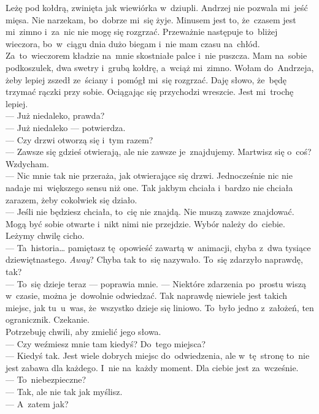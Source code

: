 \documentclass[9pt, a5paper]{memoir}
\begin{document}
Leżę pod kołdrą, zwinięta jak wiewiórka w~dziupli. Andrzej nie pozwala mi~jeść mięsa. Nie narzekam, bo~dobrze mi~się żyje. Minusem jest to, że~czasem jest mi~zimno i~za~nic nie mogę się rozgrzać. Przeważnie następuje to~bliżej wieczora, bo~w~ciągu dnia dużo biegam i~nie mam czasu na~chłód. Za~to~wieczorem kładzie na~mnie skostniałe palce i~nie puszcza. Mam na~sobie podkoszulek, dwa swetry i~grubą kołdrę, a~wciąż mi~zimno. Wołam do~Andrzeja, żeby lepiej zszedł ze~ściany i~pomógł mi~się rozgrzać. Daję słowo, że~będę trzymać rączki przy sobie. Ociągając się przychodzi wreszcie. Jest mi~trochę lepiej.\\
--- Już niedaleko, prawda?\\
--- Już niedaleko --- potwierdza.\\
--- Czy drzwi otworzą się i~tym razem?\\
--- Zawsze się gdzieś otwierają, ale nie zawsze je~znajdujemy. Martwisz się o~coś?\\
Wzdycham.\\
--- Nic mnie tak nie przeraża, jak otwierające się drzwi. Jednocześnie nic nie nadaje mi~większego sensu niż one. Tak jakbym chciała i~bardzo nie chciała zarazem, żeby cokolwiek się działo.\\
--- Jeśli nie będziesz chciała, to~cię nie znajdą. Nie muszą zawsze znajdować. Mogą być sobie otwarte i~nikt nimi nie przejdzie. Wybór należy do~ciebie.\\
Leżymy chwilę cicho.\\
--- Ta~historia\dots{} pamiętasz tę~opowieść zawartą w~animacji, chyba z~dwa tysiące dziewiętnastego. \textit{Away}? Chyba tak to~się nazywało. To~się zdarzyło naprawdę, tak?\\
--- To~się dzieje teraz --- poprawia mnie. --- Niektóre zdarzenia po~prostu wiszą w~czasie, można je~dowolnie odwiedzać. Tak naprawdę niewiele jest takich miejsc, jak tu~u~was, że~wszystko dzieje się liniowo. To~było jedno z~założeń, ten ogranicznik. Czekanie.\\
Potrzebuję chwili, aby zmielić jego słowa.\\
--- Czy weźmiesz mnie tam kiedyś? Do~tego miejsca?\\
--- Kiedyś tak. Jest wiele dobrych miejsc do~odwiedzenia, ale w~tę~stronę to~nie jest zabawa dla każdego. I~nie na~każdy moment. Dla ciebie jest za~wcześnie.\\
--- To~niebezpieczne?\\
--- Tak, ale nie tak jak myślisz.\\
--- A~zatem jak?\\
\end{document}
